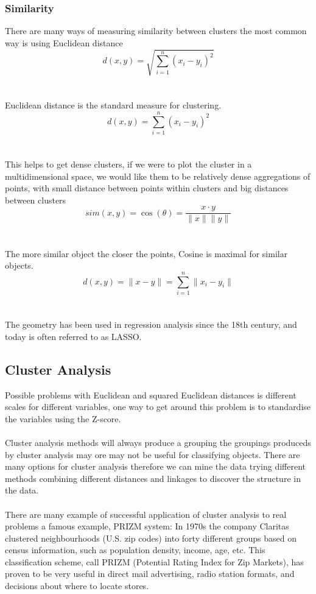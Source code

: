 \subsubsection{Similarity}
There are many ways of measuring similarity between clusters the most common way is using Euclidean distance
\begin{equation}
    d(x,y) = \sqrt{\sum_{i=1}^n (x_i - y_i)^2}
\end{equation}
\\\\
Euclidean distance is the standard measure for clustering.
\begin{equation}
    d(x,y) = \sum_{i=1}^n (x_i - y_i)^2
\end{equation}
\\\\
This helps to get dense clusters, if we were to plot the cluster in a multidimensional space, we would like them to be relatively dense aggregations of points, with small distance between points within clusters and big distances between clusters
\begin{equation}
    sim(x,y) = \cos(\theta) = \frac{x\cdot y}{\lVert x \rVert\lVert y\rVert}
\end{equation}
\\\\
The more similar object the closer the points, Cosine is maximal for similar objects.
\begin{equation}
    d(x,y) = \lVert x-y \rVert = \sum_{i=1}^n \lVert x_i - y_i \rVert
\end{equation}
\\\\
The geometry has been used in regression analysis since the 18th century, and today is often referred to as LASSO.
\subsection{Cluster Analysis}
Possible problems with Euclidean and squared Euclidean distances is different scales for different variables, one way to get around this problem is to standardise the variables using the Z-score.
\\\\
Cluster analysis methods will always produce a grouping the groupings produceds by cluster analysis may ore may not be useful for classifying objects. There are many options for cluster analysis therefore we can mine the data trying different methods combining different distances and linkages to discover the structure in the data. 
\\\\
There are many example of successful application of cluster analysis to real problems a famous example, PRIZM system: In 1970s the company Claritas clustered neighbourhoods (U.S. zip codes) into forty different groups based on census information, such as population density, income, age, etc. This classification scheme, call PRIZM (Potential Rating Index for Zip Markets), has proven to be very useful in direct mail advertising, radio station formats, and decisions about where to locate stores.
